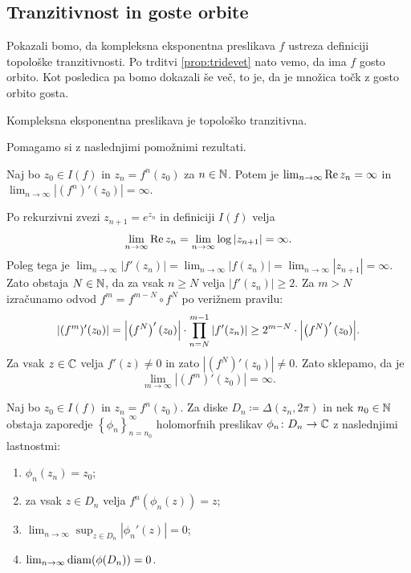 \subsection{Tranzitivnost in goste orbite} \label{sec:transitivity}

Pokazali bomo, da kompleksna eksponentna preslikava \(f\) ustreza definiciji topološke tranzitivnosti. Po trditvi \ref{prop:tridevet} nato vemo, da ima \(f\) gosto orbito. Kot posledica pa bomo dokazali še več, to je, da je množica točk z gosto orbito gosta.

\begin{izrek} \label{thm:transitivity}
    Kompleksna eksponentna preslikava je topološko tranzitivna.
\end{izrek}

\noindent Pomagamo si z naslednjimi pomožnimi rezultati.

\begin{trditev}
    Naj bo \(z_0 \in I (f)\) in \(z_n = f^n (z_0)\) za \(n \in \mathbb N\). Potem je \(\lim_{n \to \infty} \operatorname{Re} z_n = \infty\) in \(\lim_{n \to \infty} |(f^n)' (z_0)| = \infty\).
\end{trditev}

\begin{dokaz}
    Po rekurzivni zvezi \(z_{n + 1} = e^{z_n}\) in definiciji \(I (f)\) velja
    \[\lim_{n \to \infty} \operatorname{Re} z_n = \lim_{n \to \infty} \log |z_{n + 1}| = \infty.\]
    Poleg tega je \(\lim_{n \to \infty} |f' (z_n)| = \lim_{n \to \infty} |f (z_n)| = \lim_{n \to \infty} |z_{n + 1}| = \infty\). Zato obstaja \(N \in \mathbb N\), da za vsak \(n \geq N\) velja \(|f' (z_n)| \geq 2\). Za \(m > N\) izračunamo odvod \(f^{m} = f^{m - N} \circ f^{N}\) po verižnem pravilu:
    \[|(f^{m})' (z_0)| = \abs{ \prt{f^{N}}' (z_0) } \cdot \prod_{n = N}^{m - 1} |f' (z_n)| \geq 2^{m - N} \cdot \abs{ \prt{f^{N}}' (z_0) }.\]
    Za vsak \(z \in \mathbb C\) velja \(f' (z) \neq 0\) in zato \(|(f^N)' (z_0)| \neq 0\). Zato sklepamo, da je
    \[\lim_{m \to \infty} |(f^{m})' (z_0)| = \infty.\]
\end{dokaz}

\begin{trditev} \label{prop:small_disks}
    Naj bo \(z_0 \in I (f)\) in \(z_n = f^{n} (z_0)\). Za diske \(D_n \coloneq \Delta (z_n, 2 \pi)\) in nek \(n_0 \in \mathbb N\) obstaja zaporedje \(\left\{ \phi_n \right\}_{n = n_0}^{\infty}\) holomorfnih preslikav \(\phi_n \colon D_n \to \mathbb C\) z naslednjimi lastnostmi:
    \begin{enumerate}
        \item \label{item:ena} \(\phi_n (z_n) = z_0\);
        \item \label{item:dva} za vsak \(z \in D_n\) velja \(f^n (\phi_n (z)) = z\);
        \item \label{item:tri} \(\lim_{n \to \infty} \sup_{z \in D_n} |\phi_n' (z)| = 0\);
        \item \label{item:stiri} \(\lim_{n \to \infty} \operatorname{diam} (\phi (D_n)) = 0\).
    \end{enumerate}
\end{trditev}

